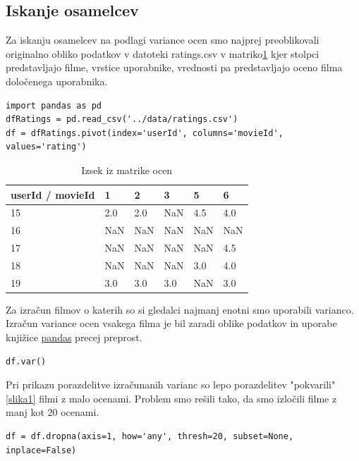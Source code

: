 \documentclass[a4paper,11pt]{article}
\begin{document}
\subsection{Iskanje osamelcev}
Za iskanju osamelcev na podlagi variance ocen smo najprej preoblikovali
originalno obliko podatkov v datoteki ratings.csv v matriko\ref{tab2} kjer stolpci
predstavljajo filme, vrstice uporabnike, vrednosti pa predstavljajo oceno
filma določenega uporabnika.

\begin{lstlisting}
import pandas as pd
dfRatings = pd.read_csv('../data/ratings.csv')
df = dfRatings.pivot(index='userId', columns='movieId', values='rating')
\end{lstlisting}

\begin{table}[htbp]
\caption{Izsek iz matrike ocen}
\label{tab2}
\begin{center}
\begin{tabular}{lllllp{2cm}}
\hline
userId / movieId & 1 & 2 & 3 & 5 & 6 \\
\hline
15 & 2.0 & 2.0 & NaN & 4.5 & 4.0 \\
16 & NaN & NaN & NaN & NaN & NaN \\
17 & NaN & NaN & NaN & NaN & 4.5 \\
18 & NaN & NaN & NaN & 3.0 & 4.0 \\
19 & 3.0 & 3.0 & 3.0 & NaN & 3.0 \\
\hline
\end{tabular}
\end{center}
\end{table}

Za izračun filmov o katerih so si gledalci najmanj enotni smo uporabili varianco. Izračun variance ocen vsakega filma je bil zaradi oblike podatkov in uporabe knjižice \href{http://pandas.pydata.org/index.html}{pandas} precej preprost.

\begin{lstlisting}
df.var()
\end{lstlisting}

Pri prikazu porazdelitve izračunanih varianc so lepo porazdelitev "pokvarili"\ref{slika1}\hspace{0cm} filmi z malo ocenami. Problem smo rešili tako, da smo izločili filme z manj kot 20 ocenami.

\begin{lstlisting}
df = df.dropna(axis=1, how='any', thresh=20, subset=None, inplace=False)
\end{lstlisting}
\end{document}
